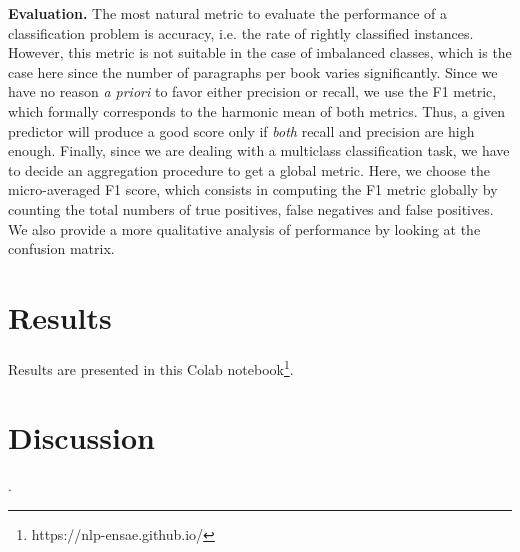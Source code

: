 \documentclass[11pt,a4paper]{article}
\begin{document}
\textbf{Evaluation.}  The most natural metric to evaluate the performance of a classification problem is accuracy, i.e. the rate of rightly classified instances. However, this metric is not suitable in the case of imbalanced classes, which is the case here since the number of paragraphs per book varies significantly. Since we have no reason \textit{a priori} to favor either precision or recall, we use the F1 metric, which formally corresponds to the harmonic mean of both metrics. Thus, a given predictor will produce a good score only if \emph{both} recall and precision are high enough. Finally, since we are dealing with a multiclass classification task, we have to decide an aggregation procedure to get a global metric. Here, we choose the micro-averaged F1 score, which consists in computing the F1 metric globally by counting the total numbers of true positives, false negatives and false positives. We also provide a more qualitative analysis of performance by looking at the confusion matrix.

\section{Results}

Results are presented in this Colab notebook\footnote{https://nlp-ensae.github.io/}.

\section{Discussion}




\newpage
.
\newpage




\appendix
\end{document}
